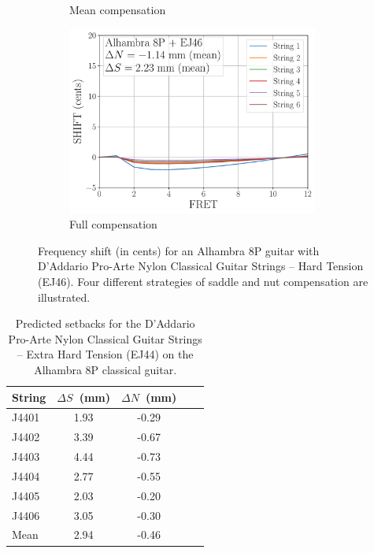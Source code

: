 \begin{figure}
\begin{subfigure}[b]{0.45\textwidth}
   \caption{Mean compensation}
   \label{fig:shift_alhambra8p_ej46_mean}
  \end{subfigure}
  \hspace{0.25in}
  \begin{subfigure}[b]{0.45\textwidth}
   \centering
   \includegraphics[width=3.25in]{figures/shift_alhambra8p_ej46_full}
   \caption{Full compensation}
   \label{fig:shift_alhambra8p_ej46_full}
  \end{subfigure}
  \caption{\label{fig:compensation} Frequency shift (in cents) for an Alhambra 8P guitar with D'Addario Pro-Arte Nylon Classical Guitar Strings -- Hard Tension (EJ46). Four different strategies of saddle and nut compensation are illustrated.}
 \end{figure}

\begin{table}%
  \centering
  \caption{\label{tbl:ej44_setbacks} Predicted setbacks for the D'Addario Pro-Arte Nylon Classical Guitar Strings -- Extra Hard Tension (EJ44) on the Alhambra 8P classical guitar.}
    \begin{tabular}{lcccc}
    \hline \hline
    String  & $\Delta S$~(mm) & $\Delta N$~(mm) \\
    \hline
    J4401 & 1.93 & -0.29 \\
    J4402 & 3.39 & -0.67 \\
    J4403 & 4.44 & -0.73 \\
    J4404 & 2.77 & -0.55 \\
    J4405 & 2.03 & -0.20 \\
    J4406 & 3.05 & -0.30 \\
    \hline \hline
    Mean & 2.94 & -0.46 \\
    \hline
    \end{tabular}%
  \label{tab:addlabel}%
\end{table}%


